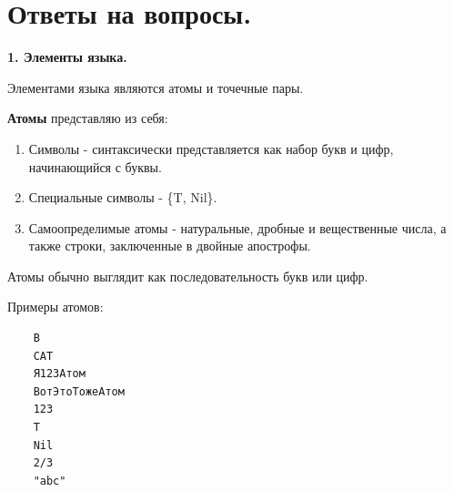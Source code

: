
\section{Ответы на вопросы.}










\textbf{1. Элементы языка.}

Элементами языка являются атомы и точечные пары.

\textbf{Атомы} представляю из себя:
\begin{enumerate}
	\item Символы - синтаксически представляется как набор букв и цифр, начинающийся с буквы.
	\item Специальные символы - \{T, Nil\}.
	\item Самоопределимые атомы - натуральные, дробные и вещественные числа, а также строки, заключенные в двойные апострофы. 
\end{enumerate}

Атомы обычно выглядит как последовательность букв или цифр.

Примеры атомов:
\begin{lstlisting}
	B
	CAT
	Я123Атом
	ВотЭтоТожеАтом
	123
	T
	Nil
	2/3
	"abc"
\end{lstlisting}

